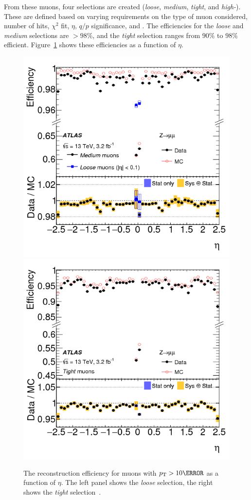From these muons, four selections are created (\textit{loose}, \textit{medium}, \textit{tight}, and \textit{high-\pt}). These are defined based on varying requirements on the type of muon considered, number of hits, $\chi^2$ fit, $\eta$, $q/p$ significance, and \pt. The efficiencies for the \textit{loose} and \textit{medium} selections are $>98\%$, and the \textit{tight} selection ranges from $90\%$ to $98\%$ efficient. Figure~\ref{fig:muon-eff} shows these efficiencies as a function of $\eta$.


\begin{figure}[h]
    \centering
    \includegraphics[width=.48\textwidth]{chapters/chapter3_eventreco/images/muon-medium.png}
    \includegraphics[width=.48\textwidth]{chapters/chapter3_eventreco/images/muon-tight.png}

    \caption[The reconstruction efficiency for \textit{loose} and \textit{tight} muons with $\pt >\unit{10}{\GeV}$ as a function of $\eta$.]
    {The reconstruction efficiency for muons with $\pt >\unit{10}{\GeV}$ as a function of $\eta$. The left panel shows the \textit{loose} selection, the right shows the \textit{tight} selection~\cite{muon-reco}.}
    \label{fig:muon-eff}
\end{figure}
